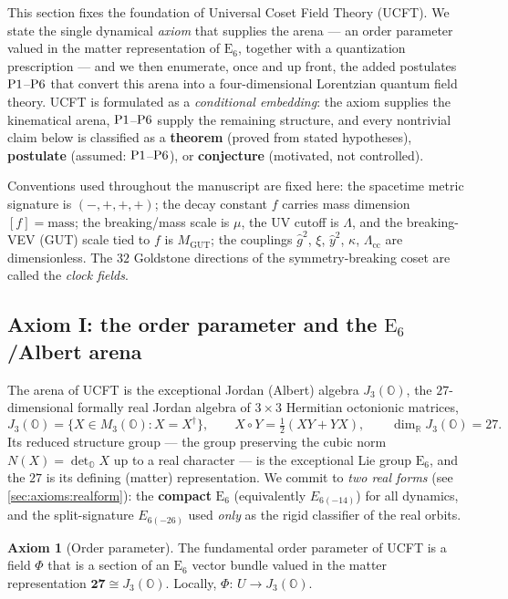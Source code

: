 \documentclass[11pt]{article}
\theoremstyle{plain}
\theoremstyle{definition}
\newtheorem{axiom}[theorem]{Axiom}
\theoremstyle{remark}
\newcommand{\E}[1]{\mathrm{E}_{#1}}
\newcommand{\Oct}{\mathbb{O}}
\newcommand{\jalg}{J_3(\mathbb{O})}
\newcommand{\ESix}{\E{6}}
\newcommand{\Rep}[1]{\mathbf{#1}}
\newcommand{\Pone}{\textnormal{P1}}
\newcommand{\Psix}{\textnormal{P6}}
\newcommand{\MGUT}{M_{\mathrm{GUT}}}
\newcommand{\ghat}{\hat g}
\newcommand{\yhat}{\hat y}
\begin{document}
This section fixes the foundation of Universal Coset Field Theory (UCFT).
We state the single dynamical \emph{axiom} that supplies the arena --- an
order parameter valued in the matter representation of $\ESix$, together
with a quantization prescription --- and we then enumerate, once and up
front, the added postulates $\Pone$--$\Psix$ that convert this arena into a
four-dimensional Lorentzian quantum field theory. UCFT is formulated as a
\emph{conditional embedding}: the axiom supplies the kinematical arena,
$\Pone$--$\Psix$ supply the remaining structure, and every nontrivial claim
below is classified as a \textbf{theorem} (proved from stated hypotheses),
\textbf{postulate} (assumed: $\Pone$--$\Psix$), or
\textbf{conjecture} (motivated, not controlled).

Conventions used throughout the manuscript are fixed here: the spacetime
metric signature is $(-,+,+,+)$; the decay constant $f$ carries mass
dimension $[f]=\text{mass}$; the breaking/mass scale is $\mu$, the UV cutoff
is $\Lambda$, and the breaking-VEV (GUT) scale tied to $f$ is $\MGUT$; the
couplings $\ghat^2$, $\xi$, $\yhat^2$, $\kappa$, $\Lambda_{\mathrm{cc}}$ are
dimensionless. The $32$ Goldstone directions of the symmetry-breaking coset
are called the \emph{clock fields}.

\subsection{Axiom I: the order parameter and the \texorpdfstring{$\ESix$}{E6}/Albert arena}
\label{sec:axioms:axiomI}

The arena of UCFT is the exceptional Jordan (Albert) algebra
$\jalg$, the $27$-dimensional formally real Jordan algebra of
$3\times3$ Hermitian octonionic matrices,
\[
  \jalg=\bigl\{X\in M_3(\Oct): X=X^{\dagger}\bigr\},
  \qquad X\circ Y=\tfrac12(XY+YX),
  \qquad \dim_{\mathbb R}\jalg=27 .
\]
Its reduced structure group --- the group preserving the cubic norm
$N(X)=\det_{\Oct}X$ up to a real character --- is the exceptional Lie group
$\ESix$, and the $27$ is its defining (matter) representation. We commit to
\emph{two real forms} (see \autoref{sec:axioms:realform}): the
\textbf{compact} $\ESix$ (equivalently $E_{6(-14)}$) for all dynamics, and
the split-signature $E_{6(-26)}$ used \emph{only} as the rigid classifier of
the real orbits.

\begin{axiom}[Order parameter]\label{ax:axioms:I}
The fundamental order parameter of UCFT is a field $\Phi$ that is a section
of an $\ESix$ vector bundle valued in the matter representation
$\Rep{27}\cong\jalg$. Locally, $\Phi:\,U\to\jalg$.
\end{axiom}
\end{document}
